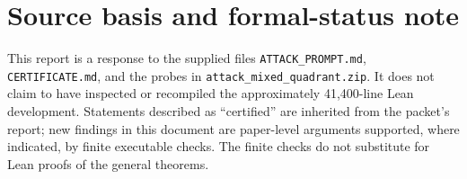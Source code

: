 \documentclass[11pt]{article}
\begin{document}
\section{Source basis and formal-status note}

This report is a response to the supplied files \texttt{ATTACK\_PROMPT.md},
\texttt{CERTIFICATE.md}, and the probes in \texttt{attack\_mixed\_quadrant.zip}. It does not
claim to have inspected or recompiled the approximately 41,400-line Lean development.
Statements described as ``certified'' are inherited from the packet's report; new findings
in this document are paper-level arguments supported, where indicated, by finite executable
checks. The finite checks do not substitute for Lean proofs of the general theorems.
\end{document}
